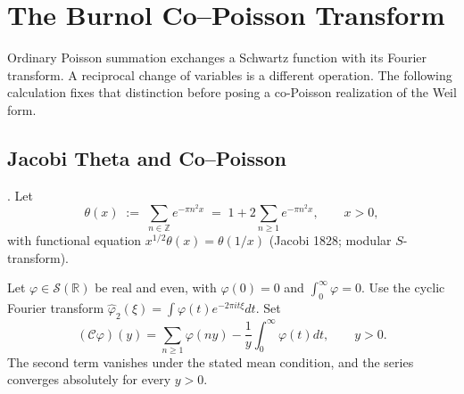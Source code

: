 \section{The Burnol Co--Poisson Transform}
\label{v4-arith:w7-i:burnol-copoisson}

Ordinary Poisson summation exchanges a Schwartz function with
its Fourier transform. A reciprocal change of variables is a
different operation. The following calculation fixes that distinction
before posing a co-Poisson realization of the Weil form.

\subsection{Jacobi Theta and Co--Poisson}
\label{v4-arith:w7-i:burnol:theta}

\begin{definition}
\label{v4-arith:w7-i:def:theta}
\ClaimStatusDefinitional. Let
\begin{equation}
\label{v4-arith:w7-i:eq:theta}
\theta(x)\;:=\;\sum_{n\in\mathbb{Z}}e^{-\pi n^{2}x}
\;=\;1+2\sum_{n\geq 1}e^{-\pi n^{2}x},\qquad x>0,
\end{equation}
with functional equation
\(x^{1/2}\theta(x)=\theta(1/x)\) (Jacobi 1828; modular \(S\)-transform).
\end{definition}

\begin{definition}
\label{v4-arith:w7-i:def:copoisson}
Let $\varphi\in\mathcal S(\mathbb R)$ be real and even, with
$\varphi(0)=0$ and $\int_0^\infty\varphi=0$.
Use the cyclic Fourier transform
$\widehat\varphi_2(\xi)=\int\varphi(t)e^{-2\pi it\xi}dt$.
Set
\begin{equation}
\label{v4-arith:w7-i:eq:copoisson}
 (\mathcal C\varphi)(y)=\sum_{n\ge1}\varphi(ny)
                 -\frac1y\int_0^\infty\varphi(t)dt,\qquad y>0.
\end{equation}
The second term vanishes under the stated mean condition, and the
series converges absolutely for every $y>0$.
\end{definition}

